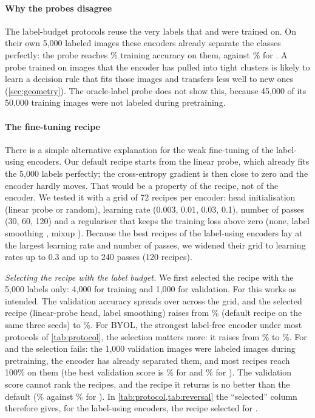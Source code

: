 \paragraph{Why the probes disagree}
The label-budget protocols reuse the very labels that \supcon and \union were trained on. On their own 5,000
labeled images these encoders already separate the classes perfectly: the \lpfive probe reaches
\% training accuracy on them, against \% for
\simclr. A probe trained on images that the encoder has pulled into tight clusters is likely to learn a decision
rule that fits those images and transfers less well to new ones (\cref{sec:geometry}). The oracle-label probe
does not show this, because 45,000 of its 50,000 training images were not labeled during pretraining.

\paragraph{The fine-tuning recipe}
\label{sec:ftrobust}
There is a simple alternative explanation for the weak fine-tuning of the label-using encoders. Our default
recipe starts from the linear probe, which already fits the 5,000 labels perfectly; the cross-entropy
gradient is then close to zero and the encoder hardly moves. That would be a property of the recipe, not of
the encoder. We tested it with a grid of 72 recipes per encoder: head initialisation (linear probe or
random), learning rate (0.003, 0.01, 0.03, 0.1), number of passes (30, 60, 120) and a regulariser that keeps
the training loss above zero (none, label smoothing \citep{szegedy2016rethinking}, mixup
\citep{zhang2018mixup}). Because the best recipes of the label-using encoders lay at the largest learning rate
and number of passes, we widened their grid to learning rates up to 0.3 and up to 240 passes (120 recipes).

\emph{Selecting the recipe with the label budget.} We first selected the recipe with the 5,000 labels only:
4,000 for training and 1,000 for validation. For \simclr this works as intended. The validation accuracy
spreads over \pt across the grid, and the selected recipe (linear-probe head,
label smoothing) raises \ftfive from \% (default recipe on the same three seeds) to
\%. For BYOL, the strongest label-free encoder under most protocols of
\cref{tab:protocol}, the selection matters more: it raises \ftfive from \% to
\%. For \supcon and \union the selection fails: the 1,000 validation images were labeled
images during pretraining, the encoder has already separated them, and most recipes reach 100\% on them (the
best validation score is \% for \supcon and
\% for \union). The validation score cannot rank the recipes, and the recipe it
returns is no better than the default (\% against \% for
\supcon). In \cref{tab:protocol,tab:reversal} the ``selected'' column therefore gives, for the label-using
encoders, the recipe selected for \simclr.

